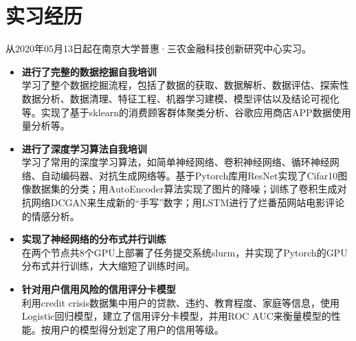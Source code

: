 \documentclass{resume}
\begin{document}
\section{实习经历}
从2020年05月13日起在南京大学普惠·三农金融科技创新研究中心实习。
\begin{itemize}%
\item \textbf{进行了完整的数据挖掘自我培训}\\
学习了整个数据挖掘流程，包括了数据的获取、数据解析、数据评估、探索性数据分析、数据清理、特征工程、机器学习建模、模型评估以及结论可视化等。实现了基于sklearn的消费顾客群体聚类分析、谷歌应用商店APP数据使用量分析等。
\item \textbf{进行了深度学习算法自我培训}\\
学习了常用的深度学习算法，如简单神经网络、卷积神经网络、循环神经网络、自动编码器、对抗生成网络等。基于Pytorch库用ResNet实现了Cifar10图像数据集的分类；用AutoEncoder算法实现了图片的降噪；训练了卷积生成对抗网络DCGAN来生成新的“手写”数字；用LSTM进行了烂番茄网站电影评论的情感分析。
\item \textbf{实现了神经网络的分布式并行训练}\\
在两个节点共8个GPU上部署了任务提交系统slurm，并实现了Pytorch的GPU分布式并行训练，大大缩短了训练时间。
\item \textbf{针对用户信用风险的信用评分卡模型}\\
利用credit crisis数据集中用户的贷款、违约、教育程度、家庭等信息，使用Logistic回归模型，建立了信用评分卡模型，并用ROC AUC来衡量模型的性能。按用户的模型得分划定了用户的信用等级。
\end{itemize}
\end{document}
